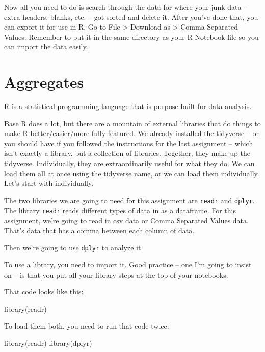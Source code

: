 \documentclass[
]{book}
\newenvironment{Shaded}{\begin{snugshade}}{\end{snugshade}}
\newcommand{\FunctionTok}[1]{\textcolor[rgb]{0.00,0.00,0.00}{#1}}
\newcommand{\NormalTok}[1]{#1}
\begin{document}
Now all you need to do is search through the data for where your junk data -- extra headers, blanks, etc. -- got sorted and delete it. After you've done that, you can export it for use in R. Go to File \textgreater{} Download as \textgreater{} Comma Separated Values. Remember to put it in the same directory as your R Notebook file so you can import the data easily.

\hypertarget{aggregates}{%
\chapter{Aggregates}\label{aggregates}}

R is a statistical programming language that is purpose built for data analysis.

Base R does a lot, but there are a mountain of external libraries that do things to make R better/easier/more fully featured. We already installed the tidyverse -- or you should have if you followed the instructions for the last assignment -- which isn't exactly a library, but a collection of libraries. Together, they make up the tidyverse. Individually, they are extraordinarily useful for what they do. We can load them all at once using the tidyverse name, or we can load them individually. Let's start with individually.

The two libraries we are going to need for this assignment are \texttt{readr} and \texttt{dplyr}. The library \texttt{readr} reads different types of data in as a dataframe. For this assignment, we're going to read in csv data or Comma Separated Values data. That's data that has a comma between each column of data.

Then we're going to use \texttt{dplyr} to analyze it.

To use a library, you need to import it. Good practice -- one I'm going to insist on -- is that you put all your library steps at the top of your notebooks.

That code looks like this:

\begin{Shaded}
\begin{Highlighting}[]
\FunctionTok{library}\NormalTok{(readr)}
\end{Highlighting}
\end{Shaded}

To load them both, you need to run that code twice:

\begin{Shaded}
\begin{Highlighting}[]
\FunctionTok{library}\NormalTok{(readr)}
\FunctionTok{library}\NormalTok{(dplyr)}
\end{Highlighting}
\end{Shaded}
\end{document}
